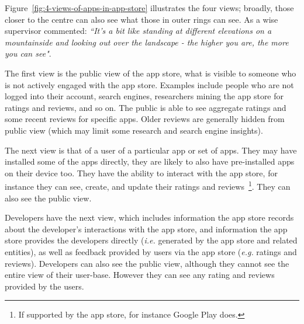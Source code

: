 Figure~\ref{fig:4-views-of-apps-in-app-store} illustrates the four views; broadly, those closer to the centre can also see what those in outer rings can see. As a wise supervisor commented: \emph{``It's a bit like standing at different elevations on a mountainside and looking out over the landscape - the higher you are, the more you can see"}.

The first view is the public view of the app store, what is visible to someone who is not actively engaged with the app store. Examples include people who are not logged into their account, search engines, researchers mining the app store for ratings and reviews, and so on. The public is able to see aggregate ratings and some recent reviews for specific apps. Older reviews are generally hidden from public view (which may limit some research and search engine insights).

The next view is that of a user of a particular app or set of apps. They may have installed some of the apps directly, they are likely to also have pre-installed apps on their device too. They have the ability to interact with the app store, for instance they can see, create, and update their ratings and reviews~\footnote{If supported by the app store, for instance Google Play does.}. They can also see the public view.

Developers have the next view, which includes information the app store records about the developer's interactions with the app store, and information the app store provides the developers directly (\emph{i.e.} generated by the app store and related entities), as well as feedback provided by users via the app store (\emph{e.g.} ratings and reviews). Developers can also see the public view, although they cannot see the entire view of their user-base. However they can see any rating and reviews provided by the users.

